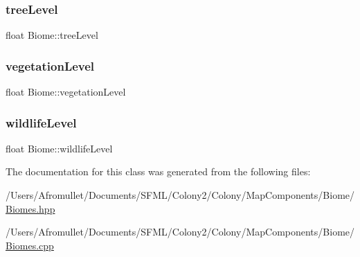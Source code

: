 \mbox{\label{class_biome_aab11a193d913aeccf5a5d4d8af6ccd05}} 
\subsubsection{\texorpdfstring{tree\+Level}{treeLevel}}
{\footnotesize\ttfamily float Biome\+::tree\+Level\hspace{0.3cm}{\ttfamily [private]}}

\mbox{\label{class_biome_af2e689d891f991d1ec7abedb2d8cbfe6}} 
\subsubsection{\texorpdfstring{vegetation\+Level}{vegetationLevel}}
{\footnotesize\ttfamily float Biome\+::vegetation\+Level\hspace{0.3cm}{\ttfamily [private]}}

\mbox{\label{class_biome_a4568b5f65ed8b774ef37d1126bb5ecd1}} 
\subsubsection{\texorpdfstring{wildlife\+Level}{wildlifeLevel}}
{\footnotesize\ttfamily float Biome\+::wildlife\+Level\hspace{0.3cm}{\ttfamily [private]}}



The documentation for this class was generated from the following files\+:\begin{DoxyCompactItemize}
\item 
/\+Users/\+Afromullet/\+Documents/\+S\+F\+M\+L/\+Colony2/\+Colony/\+Map\+Components/\+Biome/\mbox{\hyperlink{_biomes_8hpp}{Biomes.\+hpp}}\item 
/\+Users/\+Afromullet/\+Documents/\+S\+F\+M\+L/\+Colony2/\+Colony/\+Map\+Components/\+Biome/\mbox{\hyperlink{_biomes_8cpp}{Biomes.\+cpp}}\end{DoxyCompactItemize}
